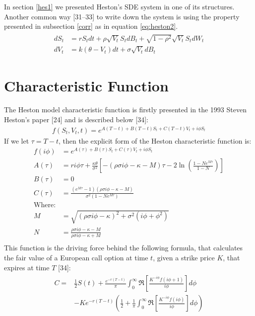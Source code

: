 \documentclass[12pt,oneside]{reedthesis}
\theoremstyle{definition}
\theoremstyle{definition}
\theoremstyle{remark}
\begin{document}
  In section \ref{hes1} we presented Heston's SDE system in one of its
  structures. Another common way {[}31--33{]} to write down the system is
  using the property presented in subsection \ref{corr} as in equation
  \eqref{eq:heston2}.
  \begin{align}
  \label{eq:heston2}
  \begin{split}
  dS_t &= r S_t dt + \rho \sqrt{V_t} S_t dB_t + \sqrt{1 - \rho^2} \sqrt{V_t} S_t dW_t \\
  dV_t &= k(\theta - V_t)dt + \sigma \sqrt{V_t} dB_t 
  \end{split}
  \end{align}
  \section{Characteristic Function}\label{characteristic-function}
  
  The Heston model characteristic function is firstly presented in the
  1993 Steven Heston's paper {[}24{]} and is described below {[}34{]}:
  \begin{align}
  f(S_t, V_t, t) = e^{A(T-t)+B(T-t)S_t + C(T-t)V_t + i \phi S_t}
  \end{align}
  If we let \(\tau = T-t\), then the explicit form of the Heston
  characteristic function is:
  \begin{align*}
  f(i \phi) &= e^{A(\tau)+B(\tau)S_t + C(\tau)V_t + i \phi S_t} \\
  A(\tau) &= r i \phi \tau + \frac{\kappa \theta}{\sigma^2} \left[ - (\rho \sigma i \phi - \kappa - M) \tau - 2 \ln\left(\frac{1-N e^{M \tau}}{1-N}\right) \right] \\
  B(\tau) &= 0 \\
  C(\tau) &= \frac{(e^{M \tau}-1)(\rho \sigma i \phi - \kappa - M)}{\sigma^2 (1-N e^{M \tau})} \\
  \text{Where:} & \\
  M &= \sqrt{(\rho \sigma i \phi - \kappa)^2 + \sigma^2 (i \phi + \phi^2)} \\
  N &= \frac{\rho \sigma i \phi - \kappa - M}{\rho \sigma i \phi - \kappa + M} \\
  \end{align*}
  This function is the driving force behind the following formula, that
  calculates the fair value of a European call option at time \(t\), given
  a strike price \(K\), that expires at time \(T\) {[}34{]}:
  \begin{align} 
  \label{eq:cfheston}
  \begin{split}
  C = & \frac{1}{2} S(t) + \frac{e^{-r(T-t)}}{\pi}\int_{0}^{\infty}{\Re \left[ \frac{K^{-i \phi} f(i \phi + 1)}{i \phi} \right] d\phi} \\
  & -Ke^{-r(T-t)}\left( \frac{1}{2} + \frac{1}{\pi} \int_{0}^{\infty}{\Re \left[ \frac{K^{-i \phi} f(i \phi)}{i \phi} \right]}  d\phi \right)
  \end{split}
  \end{align}
\end{document}
